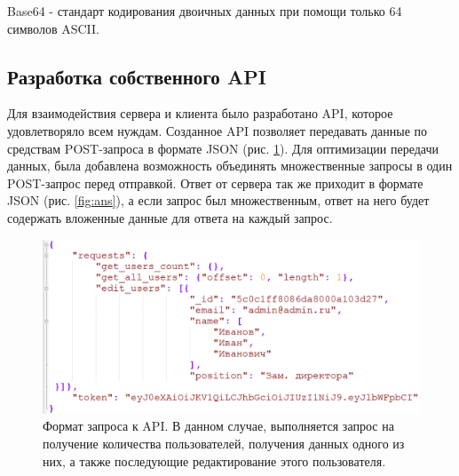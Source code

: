 \documentclass[14pt, a4paper]{extarticle}
\begin{document}
    Base64 - стандарт кодирования двоичных данных при помощи только 64 символов ASCII.


    \clearpage
    \subsection{Разработка собственного API}
    Для взаимодействия сервера и клиента было разработано API, которое удовлетворяло всем нуждам. Созданное API позволяет передавать данные по средствам POST-запроса в формате JSON (рис. \ref{fig:req}). Для оптимизации передачи данных, была добавлена возможность объединять множественные запросы в один POST-запрос перед отправкой. Ответ от сервера так же приходит в формате JSON (рис. \ref{fig:ans}), а если запрос был множественным, ответ на него будет содержать вложенные данные для ответа на каждый запрос.
    
    \begin{figure}[h]
        \centering
        \includegraphics[width=1\linewidth]{img/req.png}
        \caption{Формат запроса к API. В данном случае, выполняется запрос на получение количества пользователей, получения данных одного из них, а также последующие редактирование этого пользователя.}
        \label{fig:req}
    \end{figure}
    
\end{document}
